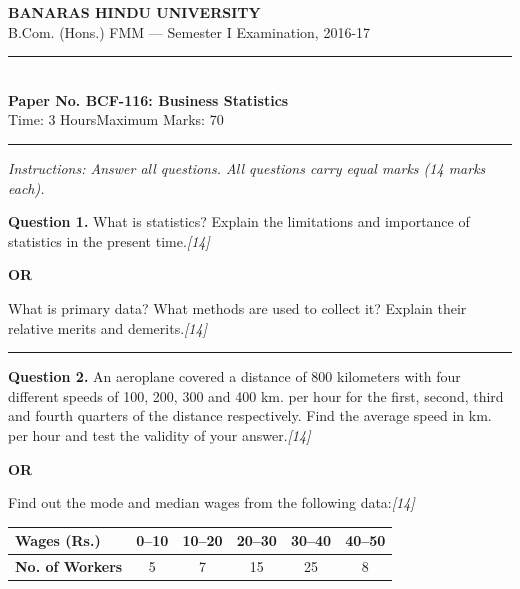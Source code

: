 \documentclass[11pt,a4paper]{article}
\newcommand{\pts}[1]{\hfill   \textit{[#1]}}
\begin{document}
\begin{center}
  {\large\bfseries BANARAS HINDU UNIVERSITY}\\[2pt]
  {\normalsize B.Com. (Hons.) FMM --- Semester I Examination, 2016-17}\\[6pt]
  \rule{0.8\linewidth}{0.5pt}\\[6pt]
  {\large\bfseries Paper No. BCF-116: Business Statistics}\\[4pt]
  {\normalsize Time: 3 Hours\hfill Maximum Marks: 70}
\end{center}

\rule{\linewidth}{0.4pt}

\smallskip



\noindent   \textit{Instructions: Answer all questions. All questions carry equal marks (14 marks each).}

\bigskip




\noindent   \textbf{Question 1.}
What is statistics? Explain the limitations and importance of statistics in the present time.\pts{14}

\centerline{   \textbf{OR}}

What is primary data? What methods are used to collect it? Explain their relative merits and demerits.\pts{14}

\medskip\rule{\linewidth}{0.2pt}




\noindent   \textbf{Question 2.}
An aeroplane covered a distance of 800 kilometers with four different speeds of 100, 200, 300 and 400 km. per hour for the first, second, third and fourth quarters of the distance respectively. Find the average speed in km. per hour and test the validity of your answer.\pts{14}

\centerline{   \textbf{OR}}

Find out the mode and median wages from the following data:\pts{14}

\begin{center}
  \renewcommand{\arraystretch}{1.2}
  
\begin{tabular}{|l|c|c|c|c|c|}
    \hline
   \textbf{Wages (Rs.)} & 0--10 & 10--20 & 20--30 & 30--40 & 40--50 \\ \hline
   \textbf{No. of Workers} & 5 & 7 & 15 & 25 & 8 \\ \hline
  \end{tabular}
\end{center}
\end{document}
